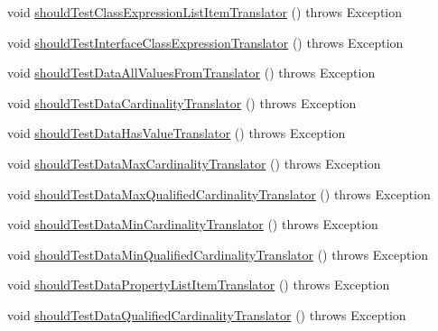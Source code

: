 \begin{DoxyCompactItemize}
void \hyperlink{classorg_1_1semanticweb_1_1owlapi_1_1contract_1_1_contract_rdfxml_parser_test_add677f32d28c126d86a45a24f9d14dce}{should\-Test\-Class\-Expression\-List\-Item\-Translator} ()  throws Exception 
\item 
void \hyperlink{classorg_1_1semanticweb_1_1owlapi_1_1contract_1_1_contract_rdfxml_parser_test_a74634866315c9e01040fab9daa982c72}{should\-Test\-Interface\-Class\-Expression\-Translator} ()  throws Exception 
\item 
void \hyperlink{classorg_1_1semanticweb_1_1owlapi_1_1contract_1_1_contract_rdfxml_parser_test_ae1ad3fddbc16767155c9aa6a9ecc6841}{should\-Test\-Data\-All\-Values\-From\-Translator} ()  throws Exception 
\item 
void \hyperlink{classorg_1_1semanticweb_1_1owlapi_1_1contract_1_1_contract_rdfxml_parser_test_a92059e67ee7f65cc632068537bb63035}{should\-Test\-Data\-Cardinality\-Translator} ()  throws Exception 
\item 
void \hyperlink{classorg_1_1semanticweb_1_1owlapi_1_1contract_1_1_contract_rdfxml_parser_test_a0c9ebf033c4ee5f0e769edd3df01621b}{should\-Test\-Data\-Has\-Value\-Translator} ()  throws Exception 
\item 
void \hyperlink{classorg_1_1semanticweb_1_1owlapi_1_1contract_1_1_contract_rdfxml_parser_test_abdbab1d1b7c179ffae9dc70ae60e44f8}{should\-Test\-Data\-Max\-Cardinality\-Translator} ()  throws Exception 
\item 
void \hyperlink{classorg_1_1semanticweb_1_1owlapi_1_1contract_1_1_contract_rdfxml_parser_test_a58064f4e93bdbea63ac0ad72b7078d55}{should\-Test\-Data\-Max\-Qualified\-Cardinality\-Translator} ()  throws Exception 
\item 
void \hyperlink{classorg_1_1semanticweb_1_1owlapi_1_1contract_1_1_contract_rdfxml_parser_test_a0f7a89a06d6efb9d7740f9c72596ae4d}{should\-Test\-Data\-Min\-Cardinality\-Translator} ()  throws Exception 
\item 
void \hyperlink{classorg_1_1semanticweb_1_1owlapi_1_1contract_1_1_contract_rdfxml_parser_test_ad75a3ae6dae3b8d451ee96bfa22ded94}{should\-Test\-Data\-Min\-Qualified\-Cardinality\-Translator} ()  throws Exception 
\item 
void \hyperlink{classorg_1_1semanticweb_1_1owlapi_1_1contract_1_1_contract_rdfxml_parser_test_a637e3686327e57ad8bce341fe72d1aca}{should\-Test\-Data\-Property\-List\-Item\-Translator} ()  throws Exception 
\item 
void \hyperlink{classorg_1_1semanticweb_1_1owlapi_1_1contract_1_1_contract_rdfxml_parser_test_a89891ffb86f73fb4d1ced6b187847806}{should\-Test\-Data\-Qualified\-Cardinality\-Translator} ()  throws Exception 

\end{DoxyCompactItemize}
